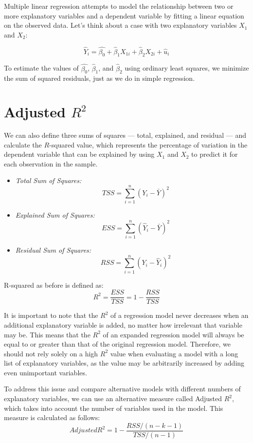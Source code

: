 \documentclass{./../../Latex/handout}
\begin{document}
\thispagestyle{plain}

Multiple linear regression attempts to model the relationship between two or more explanatory variables and a dependent variable by fitting a linear equation on the observed data. Let's think about a case with two explanatory variables $X_1$ and $X_2$:

$$ \hat{Y}_i = \hat{\beta_0} + \hat{\beta}_1 X_{1i} + \hat{\beta}_2 X_{2i} + \hat{u}_i  $$ 

To estimate the values of $\hat{\beta_0}$, $\hat{\beta}_1$, and $\hat{\beta}_2$ using ordinary least squares, we minimize the sum of squared residuals, just as we do in simple regression. 

\section{Adjusted $R^2$}
We can also define three sums of squares --- total, explained, and residual --- and calculate the $R$-squared value, which represents the percentage of variation in the dependent variable that can be explained by using $X_1$ and $X_2$ to predict it for each observation in the sample.
 \begin{itemize}
\item[]   \textit{Total Sum of Squares:} $$ \quad TSS = \sum_{i=1}^n (Y_i-\bar{Y})^2 $$
\item[]  \textit{Explained Sum of Squares:} $$ \quad ESS = \sum_{i=1}^n (\hat{Y}_i-\bar{Y})^2 $$
\item[]  \textit{Residual Sum of Squares:} $$ \quad RSS = \sum_{i=1}^n (Y_i-\hat{Y}_i)^2 $$
\end{itemize}

R-squared as before is defined as:
$$ R^2 = \frac{ESS}{TSS} = 1-\frac{RSS}{TSS} $$ 

It is important to note that the $R^2$ of a regression model never decreases when an additional explanatory variable is added, no matter how irrelevant that variable may be. This means that the $R^2$ of an expanded regression model will always be equal to or greater than that of the original regression model. Therefore, we should not rely solely on a high $R^2$ value when evaluating a model with a long list of explanatory variables, as the value may be arbitrarily increased by adding even unimportant variables.

To address this issue and compare alternative models with different numbers of explanatory variables, we can use an alternative measure called Adjusted $R^2$, which takes into account the number of variables used in the model. This measure is calculated as follows:
$$ Adjusted R^2 = 1-\frac{RSS/(n-k-1)}{TSS/(n-1)} $$ 
\end{document}
